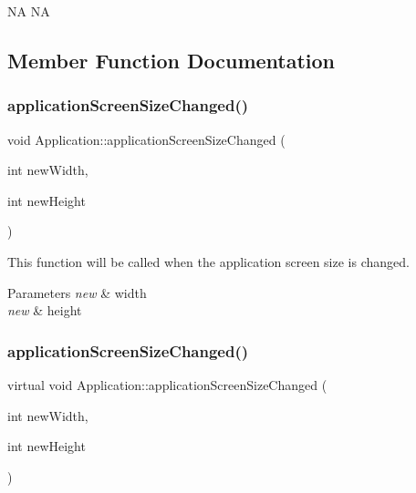 NA  NA 

\subsection{Member Function Documentation}
\mbox{\label{classApplication_a7216832b6039483348383b8836432b17}} 
\subsubsection{\texorpdfstring{application\+Screen\+Size\+Changed()}{applicationScreenSizeChanged()}\hspace{0.1cm}{\footnotesize\ttfamily [1/4]}}
{\footnotesize\ttfamily void Application\+::application\+Screen\+Size\+Changed (\begin{DoxyParamCaption}\item[{int}]{new\+Width,  }\item[{int}]{new\+Height }\end{DoxyParamCaption})\hspace{0.3cm}{\ttfamily [virtual]}}



This function will be called when the application screen size is changed. 


\begin{DoxyParams}{Parameters}
{\em new} & width \\
\hline
{\em new} & height \\
\hline
\end{DoxyParams}
\mbox{\label{classApplication_a099008d482b87b47440b11ecb536d5e3}} 
\subsubsection{\texorpdfstring{application\+Screen\+Size\+Changed()}{applicationScreenSizeChanged()}\hspace{0.1cm}{\footnotesize\ttfamily [2/4]}}
{\footnotesize\ttfamily virtual void Application\+::application\+Screen\+Size\+Changed (\begin{DoxyParamCaption}\item[{int}]{new\+Width,  }\item[{int}]{new\+Height }\end{DoxyParamCaption})\hspace{0.3cm}{\ttfamily [virtual]}}



